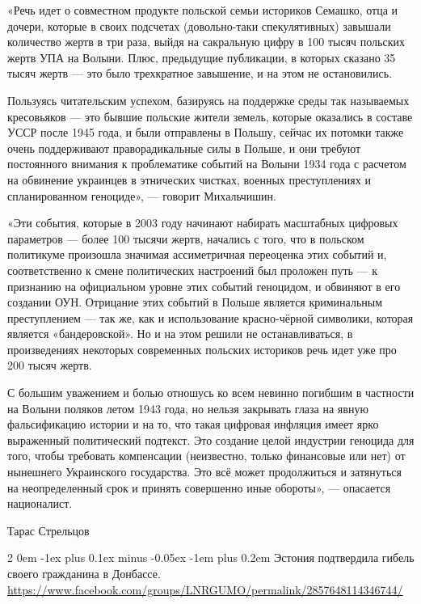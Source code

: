 \documentclass[a4paper,11pt]{extreport}
\makeatletter
\renewcommand\subsection{%
  \clearpage
    \@startsection{subsection}%
    {2}%
    {0em}%
    {-1ex plus 0.1ex minus -0.05ex}%
    {-1em plus 0.2em}%
    {\scshape\bfseries\Large}%
}
\makeatother
\begin{document}
«Речь идет о совместном продукте польской семьи историков Семашко, отца и
дочери, которые в своих подсчетах (довольно-таки спекулятивных) завышали
количество жертв в три раза, выйдя на сакральную цифру в 100 тысяч польских
жертв УПА на Волыни. Плюс, предыдущие публикации, в которых сказано 35 тысяч
жертв --- это было трехкратное завышение, и на этом не остановились.

Пользуясь читательским успехом, базируясь на поддержке среды так называемых
кресовьяков --- это бывшие польские жители земель, которые оказались в составе
УССР после 1945 года, и были отправлены в Польшу, сейчас их потомки также очень
поддерживают праворадикальные силы в Польше, и они требуют постоянного внимания
к проблематике событий на Волыни 1934 года с расчетом на обвинение украинцев в
этнических чистках, военных преступлениях и спланированном геноциде», --- говорит
Михальчишин.

«Эти события, которые в 2003 году начинают набирать масштабных цифровых
параметров --- более 100 тысячи жертв, начались с того, что в польском политикуме
произошла значимая ассиметричная переоценка этих событий и, соответственно к
смене политических настроений был проложен путь --- к признанию на официальном
уровне этих событий геноцидом, и обвиняют в его создании ОУН. Отрицание этих
событий в Польше является криминальным преступлением --- так же, как и
использование красно-чёрной символики, которая является «бандеровской». Но и на
этом решили не останавливаться, в произведениях некоторых современных польских
историков речь идет уже про 200 тысяч жертв.

С большим уважением и болью отношусь ко всем невинно погибшим в частности на
Волыни поляков летом 1943 года, но нельзя закрывать глаза на явную
фальсификацию истории и на то, что такая цифровая инфляция имеет ярко
выраженный политический подтекст. Это создание целой индустрии геноцида для
того, чтобы требовать компенсации (неизвестно, только финансовые или нет) от
нынешнего Украинского государства. Это всё может продолжиться и затянуться на
неопределенный срок и принять совершенно иные обороты», --- опасается
националист.

Тарас Стрельцов 
 
 
  
\subsection{Эстония подтвердила гибель своего гражданина в Донбассе.}
\label{sec:19_07_2020.fb.lnr.14}
\url{https://www.facebook.com/groups/LNRGUMO/permalink/2857648114346744/}
\end{document}
